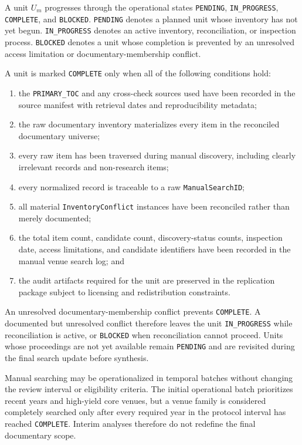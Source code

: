 A unit \(U_m\) progresses through the operational states \texttt{PENDING},
\texttt{IN\_PROGRESS}, \texttt{COMPLETE}, and \texttt{BLOCKED}. \texttt{PENDING} denotes a planned
unit whose inventory has not yet begun. \texttt{IN\_PROGRESS} denotes an active inventory,
reconciliation, or inspection process. \texttt{BLOCKED} denotes a unit whose completion is prevented
by an unresolved access limitation or documentary-membership conflict.

A unit is marked \texttt{COMPLETE} only when all of the following conditions hold:

\begin{enumerate}[label=\alph*)]
    \item the \texttt{PRIMARY\_TOC} and any cross-check sources used have been recorded in the source
    manifest with retrieval dates and reproducibility metadata;
    \item the raw documentary inventory materializes every item in the reconciled documentary universe;
    \item every raw item has been traversed during manual discovery, including clearly irrelevant
    records and non-research items;
    \item every normalized record is traceable to a raw \texttt{ManualSearchID};
    \item all material \texttt{InventoryConflict} instances have been reconciled rather than merely
    documented;
    \item the total item count, candidate count, discovery-status counts, inspection date, access
    limitations, and candidate identifiers have been recorded in the manual venue search log; and
    \item the audit artifacts required for the unit are preserved in the replication package subject
    to licensing and redistribution constraints.
\end{enumerate}

An unresolved documentary-membership conflict prevents \texttt{COMPLETE}. A documented but
unresolved conflict therefore leaves the unit \texttt{IN\_PROGRESS} while reconciliation is active,
or \texttt{BLOCKED} when reconciliation cannot proceed. Units whose proceedings are not yet
available remain \texttt{PENDING} and are revisited during the final search update before synthesis.

Manual searching may be operationalized in temporal batches without changing the review interval
or eligibility criteria. The initial operational batch prioritizes recent years and high-yield
core venues, but a venue family is considered completely searched only after every required year
in the protocol interval has reached \texttt{COMPLETE}. Interim analyses therefore do not redefine
the final documentary scope.

